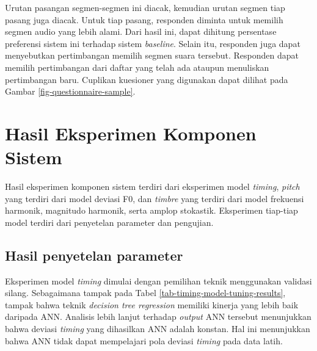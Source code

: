 Urutan pasangan segmen-segmen ini diacak, kemudian urutan segmen tiap pasang juga diacak. Untuk tiap pasang, responden diminta untuk memilih segmen audio yang lebih alami. Dari hasil ini, dapat dihitung persentase preferensi sistem ini terhadap sistem \textit{baseline}. Selain itu, responden juga dapat menyebutkan pertimbangan memilih segmen suara tersebut. Responden dapat memilih pertimbangan dari daftar yang telah ada ataupun menuliskan pertimbangan baru. Cuplikan kuesioner yang digunakan dapat dilihat pada Gambar \ref{fig-questionnaire-sample}. %

\section{Hasil Eksperimen Komponen Sistem}

Hasil eksperimen komponen sistem terdiri dari eksperimen model \textit{timing}, \textit{pitch} yang terdiri dari model deviasi F0, dan \textit{timbre} yang terdiri dari model frekuensi harmonik, magnitudo harmonik, serta amplop stokastik. Eksperimen tiap-tiap model terdiri dari penyetelan parameter dan pengujian.

\subsection{Hasil penyetelan parameter}

Eksperimen model \textit{timing} dimulai dengan pemilihan teknik menggunakan validasi silang. Sebagaimana tampak pada Tabel \ref{tab-timing-model-tuning-results}, tampak bahwa teknik \textit{decision tree regression} memiliki kinerja yang lebih baik daripada ANN. Analisis lebih lanjut terhadap \textit{output} ANN tersebut menunjukkan bahwa deviasi \textit{timing} yang dihasilkan ANN adalah konstan. Hal ini menunjukkan bahwa ANN tidak dapat mempelajari pola deviasi \textit{timing} pada data latih.

